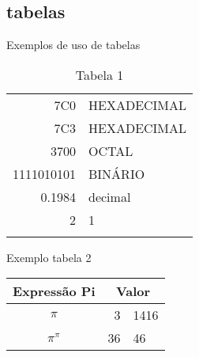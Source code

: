 \documentclass{article}
\begin{document}
\subsection*{tabelas}
Exemplos de uso de tabelas
\begin{table}
  
  \centering
  \begin{tabular}[c]{r|l}
    \hline
    7C0 & HEXADECIMAL \\
    7C3 & HEXADECIMAL \\
    3700 & OCTAL \\ \cline{2 - 2}
    1111010101 & BINÁRIO \\
    \hline \hline
    0.1984 & decimal \\
    \hline
    2 & 1\\ 
    &
    
  \end{tabular}
  \caption{Tabela 1}
  \label{tab:mylabel}
\end{table}

Exemplo tabela 2

\begin{table}
  \begin{tabular}{c r @{.} l}
    Expressão Pi &
    \multicolumn{2}{c}{Valor} \\
    \hline
    $\pi$ & 3 & 1416 \\
    $\pi^{\pi}$ & 36 & 46 \\
  \end{tabular}
\end{table}
\end{document}
